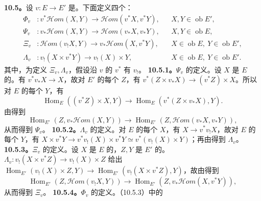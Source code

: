 \textbf{10.5。}设 $v:E\to E'$ 是。下面定义四个：
\begin{align*}
\Phi_v &:v^*\mathscr{H}\!om(X,Y)\longrightarrow\mathscr{H}\!om(v^*X,v^*Y),&&X,Y\in\operatorname{ob}E',\\
\Psi_v &:v_*\mathscr{H}\!om(X,Y)\longrightarrow\mathscr{H}\!om(v_*X,v_*Y),&&X,Y\in\operatorname{ob}E,\\
\Xi_v &: \mathscr{H}\!om(v_!X,Y)\longrightarrow v_*\mathscr{H}\!om(X,v^*Y),&&X\in\operatorname{ob}E,\ Y\in\operatorname{ob}E',\\
\Lambda_v &:v_!(X\times v^*Y)\longrightarrow v_!(X)\times Y,&&X\in\operatorname{ob}E,\ Y\in\operatorname{ob}E'.
\end{align*}
其中，为定义 $\Xi_v,\Lambda_v$，假设沿 $v$ 的 $v^*$ 有 $v_!$。
\textbf{10.5.1。}$\Psi_v$ 的定义。设 $X$ 是 $E$ 的。有 $v^*v_*X\to X$，故对 $E'$ 的每个 $Z$，有 $v^*(Z\times v_*X)\to(v^*Z)\times X$。所以对 $E$ 的每个 $Y$，有
\[
\operatorname{Hom}_E((v^*Z)\times X,Y)\longrightarrow\operatorname{Hom}_E(v^*(Z\times v_*X),Y).
\]
由得到
\[
\operatorname{Hom}_{E'}(Z,v_*\mathscr{H}\!om(X,Y))\longrightarrow\operatorname{Hom}_{E'}(Z,\mathscr{H}\!om(v_*X,v_*Y)),
\]
从而得到 $\Psi_v$。
\textbf{10.5.2。}$\Lambda_v$ 的定义。对 $E$ 的每个 $X$，有 $X\to v^*v_!X$，故对 $E$ 的每个 $Y$，有
$X\times v^*Y\to v^*v_!(X)\times v^*Y\simeq v^*(v_!(X)\times Y)$；再由得到 $\Lambda_v$。
\textbf{10.5.3。}$\Xi_v$ 的定义。设 $X$ 是 $E$ 的，$Z,Y$ 是 $E'$ 的。 $\Lambda_v:v_!(X\times v^*Z)\to v_!(X)\times Z$ 给出
$\operatorname{Hom}_{E'}(v_!(X)\times Z,Y)\to\operatorname{Hom}_{E'}(v_!(X\times v^*Z),Y)$，故由得到
\[
\operatorname{Hom}_{E'}(Z,\mathscr{H}\!om(v_!X,Y))\longrightarrow\operatorname{Hom}_{E'}(Z,v_*\mathscr{H}\!om(X,v^*Y)),
\]
从而得到 $\Xi_v$。
\textbf{10.5.4。}$\Phi_v$ 的定义。（10.5.3）中的
